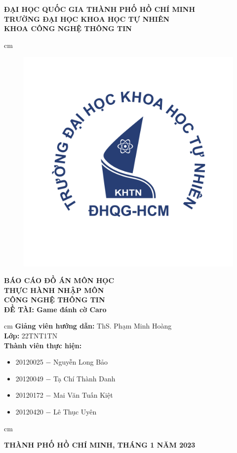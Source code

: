 \begin{titlepage}
\begin{mybox}
\begin{center}
\fontsize{12}{12}\selectfont
\textbf{ĐẠI HỌC QUỐC GIA THÀNH PHỐ HỒ CHÍ MINH}\\
\textbf{TRƯỜNG ĐẠI HỌC KHOA HỌC TỰ NHIÊN}\\
\textbf{KHOA CÔNG NGHỆ THÔNG TIN}
\end{center}
 cm
\begin{figure}[H]
\begin{center}
\includegraphics[scale=0.25]{images/logo}
\end{center}
\end{figure}
\begin{center}
\fontsize{18}{14}\selectfont
\textbf{BÁO CÁO ĐỒ ÁN MÔN HỌC}\\
\fontsize{26}{16}\selectfont
\textbf{THỰC HÀNH NHẬP MÔN\\ CÔNG NGHỆ THÔNG TIN}\\
\fontsize{18}{12}\selectfont
\textbf{ĐỀ TÀI: Game đánh cờ Caro}
\end{center}
 cm
\fontsize{14}{12}\selectfont
\textbf{Giảng viên hướng dẫn:} ThS. Phạm Minh Hoàng\\
\textbf{Lớp:} 22TNT1TN\\
\textbf{Thành viên thực hiện:}
\begin{itemize}
\item 20120025 $-$ Nguyễn Long Bảo
\item 20120049 $-$ Tạ Chí Thành Danh
\item 20120172 $-$ Mai Văn Tuấn Kiệt
\item 20120420 $-$ Lê Thục Uyên
\end{itemize}
 cm
\begin{center}
\textbf{THÀNH PHỐ HỒ CHÍ MINH, THÁNG 1 NĂM 2023}
\end{center}
\end{mybox}
\end{titlepage}